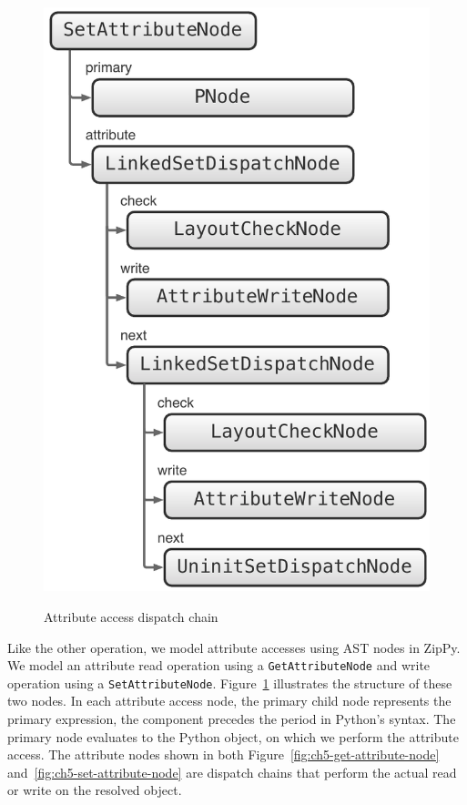 \begin{figure}
{	\includegraphics[scale=.55]{figures/ch5-set-attribute-node}
	\label{fig:ch5-set-attribute-node}
}
\caption{Attribute access dispatch chain}
\label{fig:ch5-attribute-access-dispatch-chain}
\end{figure}

Like the other operation, we model attribute accesses using AST nodes in ZipPy.
We model an attribute read operation using a \texttt{GetAttributeNode} and write operation using a \texttt{SetAttributeNode}.
Figure~\ref{fig:ch5-attribute-access-dispatch-chain} illustrates the structure of these two nodes.
In each attribute access node, the \textsf{primary} child node represents the primary expression, the component precedes the period in Python's syntax.
The \textsf{primary} node evaluates to the Python object, on which we perform the attribute access.
The \textsf{attribute} nodes shown in both Figure~\ref{fig:ch5-get-attribute-node} and~\ref{fig:ch5-set-attribute-node} are dispatch chains that perform the actual read or write on the resolved object.

